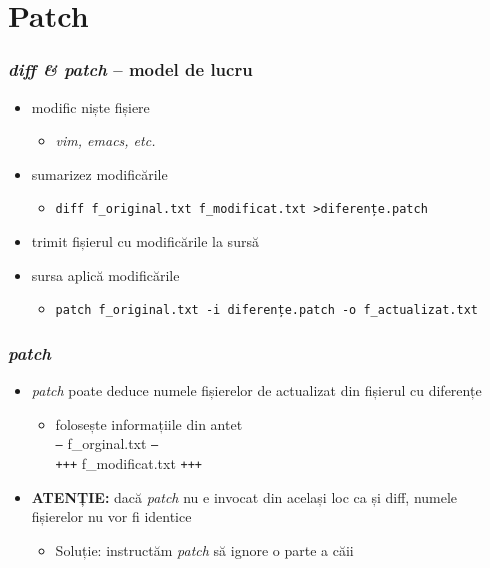 \documentclass{beamer}
\begin{document}
\section{Patch}
\frame{\tableofcontents[currentsection]}


\begin{frame}
  \frametitle{\textit{diff \& patch} – model de lucru}
  \begin{itemize}[<+->]
  \item modific niște fișiere
    \begin{itemize}
      \item \textit{vim, emacs, etc.}
    \end{itemize}
  \item sumarizez modificările
    \begin{itemize}
    \item \scriptsize{\texttt{diff f\_original.txt f\_modificat.txt \textgreater diferențe.patch}}
    \end{itemize}
  \item trimit fișierul cu modificările la sursă
  \item sursa aplică modificările
    \begin{itemize}
    \item \scriptsize{\texttt{patch f\_original.txt -i diferențe.patch -o f\_actualizat.txt}}
    \end{itemize}

  \end{itemize}
\end{frame}


\begin{frame}
  \frametitle{\textit{patch}}
  \begin{itemize}[<+->]

  \item \textit{patch} poate deduce numele fișierelor de actualizat din fișierul cu diferențe
    \begin{itemize}
    \item folosește informațiile din antet \\
      \texttt{---} f\_orginal.txt \texttt{---} \\
      \texttt{+++} f\_modificat.txt \texttt{+++}
    \end{itemize}

  \item \textbf{ATENȚIE: } dacă \textit{patch} nu e invocat din același loc ca și diff, numele fișierelor nu vor fi identice
    \begin{itemize}
    \item Soluție: instructăm \textit{patch} să ignore o parte a căii
    \end{itemize}
  \end{itemize}
\end{frame}
\end{document}
